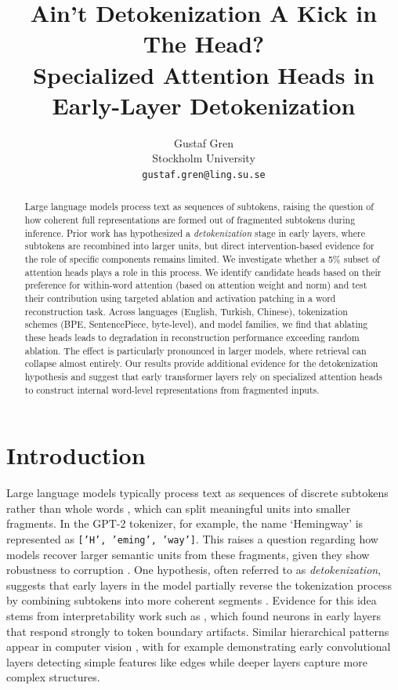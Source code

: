 \documentclass[11pt]{article}
\title{Ain't Detokenization A Kick in The Head? \\ Specialized Attention Heads in Early-Layer Detokenization}
\author{
  Gustaf Gren \\
  Stockholm University \\
  \texttt{gustaf.gren@ling.su.se}
}
\begin{document}
\maketitle

\begin{abstract}
Large language models process text as sequences of subtokens, raising the question of how coherent full representations are formed out of fragmented subtokens during inference. Prior work has hypothesized a \textit{detokenization} stage in early layers, where subtokens are recombined into larger units, but direct intervention-based evidence for the role of specific components remains limited. We investigate whether a 5\% subset of attention heads plays a role in this process. We identify candidate heads based on their preference for within-word attention (based on attention weight and norm) and test their contribution using targeted ablation and activation patching in a word reconstruction task. Across languages (English, Turkish, Chinese), tokenization schemes (BPE, SentencePiece, byte-level), and model families, we find that ablating these heads leads to degradation in reconstruction performance exceeding random ablation. The effect is particularly pronounced in larger models, where retrieval can collapse almost entirely. Our results provide additional evidence for the detokenization hypothesis and suggest that early transformer layers rely on specialized attention heads to construct internal word-level representations from fragmented inputs.
\end{abstract}

\section{Introduction}

Large language models typically process text as sequences of discrete subtokens rather than whole words \citep{mielke2021}, which can split meaningful units into smaller fragments. In the GPT-2 tokenizer, for example, the name `Hemingway' is represented as \texttt{['H',~'eming',~'way']}. This raises a question regarding how models recover larger semantic units from these fragments, given they show robustness to corruption \citep{cao2023}. One hypothesis, often referred to as \textit{detokenization}, suggests that early layers in the model partially reverse the tokenization process by combining subtokens into more coherent segments \citep{kaplan2025,feucht2024}. Evidence for this idea stems from interpretability work such as \citet{elhage2022a}, which found neurons in early layers that respond strongly to token boundary artifacts. Similar hierarchical patterns appear in computer vision \citep{jastrzebski2018}, with for example \citet{zeiler2014} demonstrating early convolutional layers detecting simple features like edges while deeper layers capture more complex structures.
\end{document}
